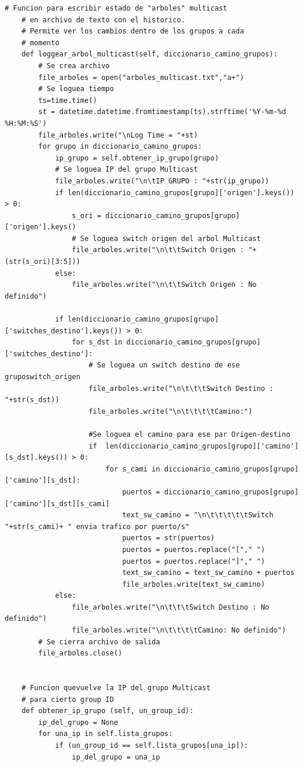 \documentclass[12pt,a4paper,oneside]{book}
\begin{document}
\begin{lstlisting}[style=codigobase,  label = cod_correrP, caption= controlador.py]
    # Funcion para escribir estado de "arboles" multicast
    # en archivo de texto con el historico.
    # Permite ver los cambios dentro de los grupos a cada
    # momento
    def loggear_arbol_multicast(self, diccionario_camino_grupos):
        # Se crea archivo
        file_arboles = open("arboles_multicast.txt","a+")
        # Se loguea tiempo
        ts=time.time()
        st = datetime.datetime.fromtimestamp(ts).strftime('%Y-%m-%d %H:%M:%S')
        file_arboles.write("\nLog Time = "+st)
        for grupo in diccionario_camino_grupos:
            ip_grupo = self.obtener_ip_grupo(grupo)
            # Se loguea IP del grupo Multicast
            file_arboles.write("\n\tIP GRUPO : "+str(ip_grupo))
            if len(diccionario_camino_grupos[grupo]['origen'].keys()) > 0:
                s_ori = diccionario_camino_grupos[grupo]['origen'].keys()
                # Se loguea switch origen del arbol Multicast
                file_arboles.write("\n\t\tSwitch Origen : "+(str(s_ori)[3:5]))
            else:
                file_arboles.write("\n\t\tSwitch Origen : No definido")

            if len(diccionario_camino_grupos[grupo]['switches_destino'].keys()) > 0:
                for s_dst in diccionario_camino_grupos[grupo]['switches_destino']:
                    # Se loguea un switch destino de ese gruposwitch_origen
                    file_arboles.write("\n\t\t\tSwitch Destino : "+str(s_dst))
                    file_arboles.write("\n\t\t\t\tCamino:")

                    #Se loguea el camino para ese par Origen-destino
                    if  len(diccionario_camino_grupos[grupo]['camino'][s_dst].keys()) > 0:
                        for s_cami in diccionario_camino_grupos[grupo]['camino'][s_dst]:
                            puertos = diccionario_camino_grupos[grupo]['camino'][s_dst][s_cami]
                            text_sw_camino = "\n\t\t\t\t\tSwitch "+str(s_cami)+ " envia trafico por puerto/s"
                            puertos = str(puertos)
                            puertos = puertos.replace("["," ")
                            puertos = puertos.replace("]"," ")
                            text_sw_camino = text_sw_camino + puertos
                            file_arboles.write(text_sw_camino)
            else:
                file_arboles.write("\n\t\t\tSwitch Destino : No definido")
                file_arboles.write("\n\t\t\t\tCamino: No definido")
        # Se cierra archivo de salida
        file_arboles.close()


    # Funcion quevuelve la IP del grupo Multicast
    # para cierto group ID
    def obtener_ip_grupo (self, un_group_id):
        ip_del_grupo = None
        for una_ip in self.lista_grupos:
            if (un_group_id == self.lista_grupos[una_ip]):
                ip_del_grupo = una_ip


\end{lstlisting}
\end{document}
